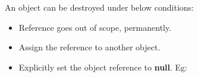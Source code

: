 \setlength{\columnsep}{3pt}
\begin{flushleft}

	An object can be destroyed under below conditions:	
		\begin{itemize}
			\item Reference goes out of scope, permanently.
			\item Assign the reference to another object.
			\item Explicitly set the object reference to \textbf{null}.
			\newline
			Eg:
			\bigskip
		\end{itemize}
	
	
\end{flushleft}

\newpage
